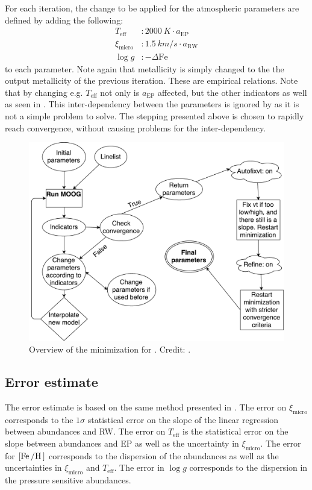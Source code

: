 For each iteration, the change to be applied for the atmospheric parameters are defined by adding
the following:
\begin{align}
  T_\mathrm{eff}     &: \SI{2000}{K} \cdot a_\mathrm{EP}   \\
  \xi_\mathrm{micro} &: \SI{1.5}{km/s} \cdot a_\mathrm{RW} \\
  \log g             &: -\Delta\mathrm{Fe}
\end{align}
to each parameter. Note again that metallicity is simply changed to the the output metallicity of
the previous iteration. These are empirical relations. Note that by changing e.g. $T_\mathrm{eff}$
not only is $a_\mathrm{EP}$ affected, but the other indicators as well as seen in .
This inter-dependency between the parameters is ignored by  as it is not a simple
problem to solve. The stepping presented above is chosen to rapidly reach convergence, without
causing problems for the inter-dependency.

\begin{figure}[htpb!]
    \centering
    \includegraphics[width=0.85\linewidth]{figures/FASMA_minimization.pdf}
    \caption{Overview of the minimization for . Credit: \citet{Andreasen2017a}.}
    \label{fig:minimization}
\end{figure}


\subsection{Error estimate}
\label{sec:error_estimate}

The error estimate is based on the same method presented in \citet{Neuforge1997}. The error on
$\xi_\mathrm{micro}$ corresponds to the $1\sigma$ statistical error on the slope of the linear
regression between  abundances and RW. The error on $T_\mathrm{eff}$ is the statistical
error on the slope between  abundances and EP as well as the uncertainty in
$\xi_\mathrm{micro}$. The error for $[\ion{Fe}/\ion{H}]$ corresponds to the dispersion of the
 abundances as well as the uncertainties in $\xi_\mathrm{micro}$ and $T_\mathrm{eff}$.
The error in $\log g$ corresponds to the dispersion in the pressure sensitive 
abundances.

